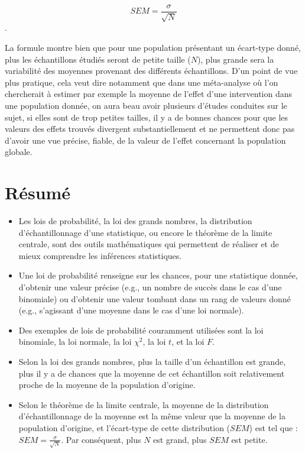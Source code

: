 \documentclass[
  letterpaper,
]{book}
\providecommand{\tightlist}{%
  \setlength{\itemsep}{0pt}\setlength{\parskip}{0pt}}\usepackage{longtable,booktabs,array}
\begin{document}
\[SEM = \frac{\sigma}{\sqrt{N}}\].

La formule montre bien que pour une population présentant un écart-type
donné, plus les échantillons étudiés seront de petite taille (\(N\)),
plus grande sera la variabilité des moyennes provenant des différents
échantillons. D'un point de vue plus pratique, cela veut dire notamment
que dans une méta-analyse où l'on chercherait à estimer par exemple la
moyenne de l'effet d'une intervention dans une population donnée, on
aura beau avoir plusieurs d'études conduites sur le sujet, si elles sont
de trop petites tailles, il y a de bonnes chances pour que les valeurs
des effets trouvés divergent substantiellement et ne permettent donc pas
d'avoir une vue précise, fiable, de la valeur de l'effet concernant la
population globale.

\section{Résumé}\label{ruxe9sumuxe9-5}

\begin{itemize}
\tightlist
\item
  Les lois de probabilité, la loi des grands nombres, la distribution
  d'échantillonnage d'une statistique, ou encore le théorème de la
  limite centrale, sont des outils mathématiques qui permettent de
  réaliser et de mieux comprendre les inférences statistiques.
\item
  Une loi de probabilité renseigne sur les chances, pour une statistique
  donnée, d'obtenir une valeur précise (e.g., un nombre de succès dans
  le cas d'une binomiale) ou d'obtenir une valeur tombant dans un rang
  de valeurs donné (e.g., s'agissant d'une moyenne dans le cas d'une loi
  normale).
\item
  Des exemples de lois de probabilité couramment utilisées sont la loi
  binomiale, la loi normale, la loi \(\chi^2\), la loi \(t\), et la loi
  \(F\).
\item
  Selon la loi des grands nombres, plus la taille d'un échantillon est
  grande, plus il y a de chances que la moyenne de cet échantillon soit
  relativement proche de la moyenne de la population d'origine.
\item
  Selon le théorème de la limite centrale, la moyenne de la distribution
  d'échantillonnage de la moyenne est la même valeur que la moyenne de
  la population d'origine, et l'écart-type de cette distribution
  (\(SEM\)) est tel que : \(SEM = \frac{\sigma}{\sqrt{N}}\). Par
  conséquent, plus \(N\) est grand, plus \(SEM\) est petite.
\end{itemize}
\end{document}
